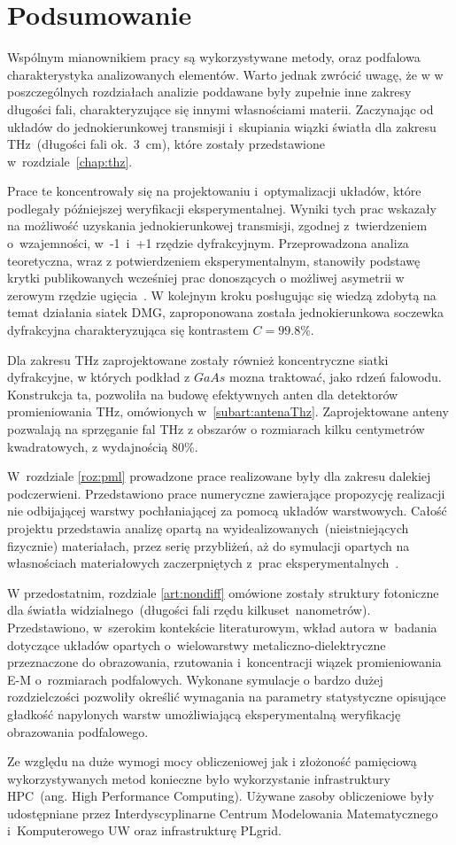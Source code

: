 \chapter{Podsumowanie}
Wspólnym mianownikiem pracy są wykorzystywane metody, oraz podfalowa charakterystyka analizowanych elementów. Warto jednak zwrócić uwagę, że w w poszczególnych rozdziałach analizie poddawane były zupełnie inne zakresy długości fali, charakteryzujące się innymi własnościami materii. Zaczynając od układów do jednokierunkowej transmisji i~skupiania wiązki światła dla zakresu THz~(długości fali ok.~3~cm), które zostały przedstawione w~rozdziale~\ref{chap:thz}. 

Prace te koncentrowały się na projektowaniu i~optymalizacji układów, które podlegały późniejszej weryfikacji eksperymentalnej. Wyniki tych prac wskazały na możliwość uzyskania jednokierunkowej transmisji, zgodnej z~twierdzeniem o~wzajemności, w~-1~i~+1 rzędzie dyfrakcyjnym. Przeprowadzona analiza teoretyczna, wraz z potwierdzeniem eksperymentalnym, stanowiły podstawę krytki publikowanych wcześniej prac donoszących o możliwej asymetrii w zerowym rzędzie ugięcia~\cite{Stolarek:13}. W kolejnym kroku posługując się wiedzą zdobytą na temat działania siatek DMG, zaproponowana została jednokierunkowa soczewka dyfrakcyjna charakteryzująca się kontrastem $C=99.8\%$. 

Dla zakresu THz zaprojektowane zostały również koncentryczne siatki dyfrakcyjne, w których podkład z $GaAs$ mozna traktować, jako rdzeń falowodu. Konstrukcja ta, pozwoliła na budowę efektywnych anten dla detektorów promieniowania THz, omówionych w~\ref{subart:antenaThz}. Zaprojektowane anteny pozwalają na sprzęganie fal THz z obszarów o rozmiarach kilku centymetrów kwadratowych, z wydajnością  80\%.

W~rozdziale \ref{roz:pml} prowadzone prace realizowane były dla zakresu dalekiej podczerwieni. Przedstawiono prace numeryczne zawierające propozycję realizacji nie odbijającej warstwy pochłaniającej za pomocą układów warstwowych. Całość projektu przedstawia analizę opartą na wyidealizowanych~(nieistniejących fizycznie) materiałach, przez serię przybliżeń, aż do symulacji opartych na własnościach materiałowych zaczerpniętych z~prac eksperymentalnych~\cite{ania2015,stefaniuk2015perfectly}.

W przedostatnim,  rozdziale \ref{art:nondiff}  omówione zostały struktury fotoniczne dla światła widzialnego~(długości fali rzędu kilkuset~nanometrów). Przedstawiono, w~szerokim kontekście literaturowym, wkład autora w~badania dotyczące układów opartych o~wielowarstwy metaliczno-dielektryczne przeznaczone do obrazowania, rzutowania i~koncentracji wiązek promieniowania E-M o~rozmiarach podfalowych. Wykonane symulacje o bardzo dużej rozdzielczości pozwoliły określić wymagania na parametry statystyczne opisujące gładkość napylonych warstw umożliwiającą eksperymentalną weryfikację obrazowania podfalowego.

Ze względu na duże wymogi mocy obliczeniowej jak i złożoność pamięciową wykorzystywanych metod konieczne było wykorzystanie infrastruktury HPC~(ang. High Performance Computing). Używane zasoby obliczeniowe były udostępniane przez Interdyscyplinarne Centrum Modelowania Matematycznego i~Komputerowego UW oraz infrastrukturę PLgrid. 
